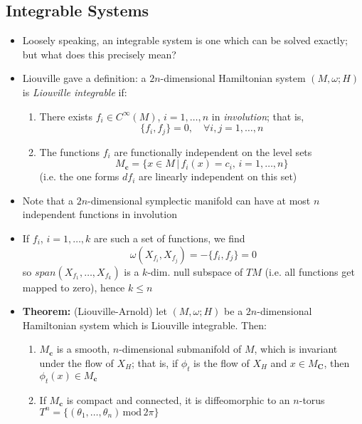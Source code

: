 \documentclass[12pt,a4paper]{article}
\numberwithin{equation}{section}
\begin{document}
	\subsection{Integrable Systems}
	\begin{itemize}
		\item Loosely speaking, an integrable system is one which can be solved exactly; but what does this precisely mean?
		\item Liouville gave a definition: a $2n$-dimensional Hamiltonian system $(M,\omega;H)$ is \textit{Liouville integrable} if:
		\begin{enumerate}
			\item There exists $f_{i}\in C^{\infty}(M)$, $i=1,\ldots,n$ in \textit{involution}; that is, 
			\begin{equation}
				\{f_{i},f_{j}\}=0,\quad \forall i,j=1,\ldots,n
			\end{equation}
			\item The functions $f_{i}$ are functionally independent on the level sets
			\begin{equation}
				M_{\mathbf{c}}=\{x\in M\,|\, f_{i}(x)=c_{i},\,i=1,\ldots,n\}
			\end{equation}
			(i.e. the one forms $df_{i}$ are linearly independent on this set)
		\end{enumerate}
		\item Note that a $2n$-dimensional symplectic manifold can have at most $n$ independent functions in involution
		\item If $f_{i}$, $i=1,\ldots,k$ are such a set of functions, we find
		\begin{equation}
			\omega(X_{f_{i}},X_{f_{j}})=-\{f_{i},f_{j}\}=0
		\end{equation}
		so $span(X_{f_{1}},\ldots, X_{f_{k}})$ is a $k$-dim. null subspace of $TM$ (i.e. all functions get mapped to zero), hence $k\leq n$
		\item \textbf{Theorem:} (Liouville-Arnold) let $(M,\omega;H)$ be a $2n$-dimensional Hamiltonian system which is Liouville integrable. Then:
		\begin{enumerate}
			\item $M_{\mathbf{c}}$ is a smooth, $n$-dimensional submanifold of $M$, which is invariant under the flow of $X_{H}$; that is, if $\phi_{t}$ is the flow of $X_{H}$ and $x\in M_{\mathbf{C}}$, then $\phi_{t}(x)\in M_{\mathbf{c}}$
			\item If $M_{\mathbf{c}}$ is compact and connected, it is diffeomorphic to an $n$-torus $T^{n}=\{(\theta_{1},\ldots,\theta_{n})\, \text{mod}\, 2\pi\}$

\end{enumerate}
\end{itemize}
\end{document}

